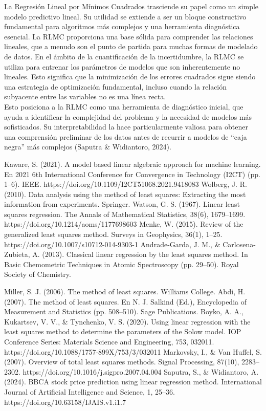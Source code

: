 \documentclass[]{article}
\begin{document}
	La Regresión Lineal por Mínimos Cuadrados trasciende su papel como un simple modelo predictivo lineal. Su utilidad se extiende a ser un bloque constructivo fundamental para algoritmos más complejos y una herramienta diagnóstica esencial. La RLMC proporciona una base sólida para comprender las relaciones lineales, que a menudo son el punto de partida para muchas formas de modelado de datos. En el ámbito de la cuantificación de la incertidumbre, la RLMC se utiliza para entrenar los parámetros de modelos que son inherentemente no lineales. Esto significa que la minimización de los errores cuadrados sigue siendo una estrategia de optimización fundamental, incluso cuando la relación subyacente entre las variables no es una línea recta.
	\\
	Esto posiciona a la RLMC como una herramienta de diagnóstico inicial, que ayuda a identificar la complejidad del problema y la necesidad de modelos más sofisticados. Su interpretabilidad la hace particularmente valiosa para obtener una comprensión preliminar de los datos antes de recurrir a modelos de “caja negra” más complejos (Saputra \& Widiantoro, 2024).
	\\
	
\begin{thebibliography}{00}
	
	 Kaware, S. (2021). A model based linear algebraic approach for machine learning. En 2021 6th International Conference for Convergence in Technology (I2CT) (pp. 1–6). IEEE. https://doi.org/10.1109/I2CT51068.2021.9418083
	 Wolberg, J. R. (2010). Data analysis using the method of least squares: Extracting the most information from experiments. Springer.
	 Watson, G. S. (1967). Linear least squares regression. The Annals of Mathematical Statistics, 38(6), 1679–1699. https://doi.org/10.1214/aoms/1177698603
	 Menke, W. (2015). Review of the generalized least squares method. Surveys in Geophysics, 36(1), 1–25. https://doi.org/10.1007/s10712-014-9303-1
	 Andrade-Garda, J. M., \& Carlosena-Zubieta, A. (2013). Classical linear regression by the least squares method. In Basic Chemometric Techniques in Atomic Spectroscopy (pp. 29–50). Royal Society of Chemistry.
	
	 Miller, S. J. (2006). The method of least squares. Williams College.
	 Abdi, H. (2007). The method of least squares. En N. J. Salkind (Ed.), Encyclopedia of Measurement and Statistics (pp. 508–510). Sage Publications.
	 Boyko, A. A., Kukartsev, V. V., \& Tynchenko, V. S. (2020). Using linear regression with the least squares method to determine the parameters of the Solow model. IOP Conference Series: Materials Science and Engineering, 753, 032011. https://doi.org/10.1088/1757-899X/753/3/032011
	 Markovsky, I., \& Van Huffel, S. (2007). Overview of total least squares methods. Signal Processing, 87(10), 2283–2302. https://doi.org/10.1016/j.sigpro.2007.04.004
	 Saputra, S., \& Widiantoro, A. (2024). BBCA stock price prediction using linear regression method. International Journal of Artificial Intelligence and Science, 1, 25–36. https://doi.org/10.63158/IJAIS.v1.i1.7
	
\end{thebibliography}
\end{document}
